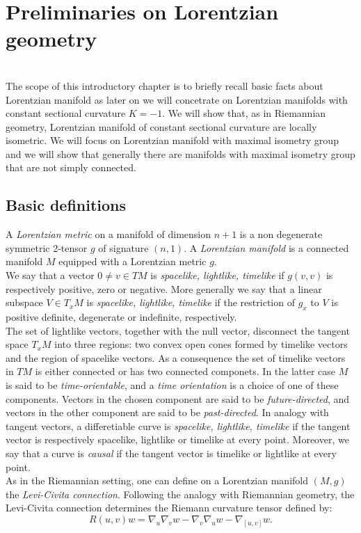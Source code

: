 \chapter{Preliminaries on Lorentzian geometry}

\\
The scope of this introductory chapter is to briefly recall basic facts about Lorentzian manifold as later on we will concetrate on Lorentzian manifolds with constant sectional curvature $K=-1$.
We will show that, as in Riemannian geometry, Lorentzian manifold of constant sectional curvature are locally isometric. We will focus on Lorentzian manifold with maximal isometry group and we will show that generally there are manifolds with maximal isometry group that are not simply connected.
\section{Basic definitions}
A \textit{Lorentzian metric} on a manifold of dimension $n+1$ is a non degenerate symmetric 2-tensor $g$ of signature $(n,1)$.
A \textit{Lorentzian manifold} is a connected manifold $M$ equipped with a Lorentzian metric $g$.\\
We say that a vector $0\neq v \in TM$ is \textit{spacelike, lightlike, timelike} if $g(v,v)$ is respectively positive, zero or negative.
More generally we say that a linear subspace $V \in T_x M$ is \textit{spacelike, lightlike, timelike} if the restriction of $g_x$ to $V$ is positive definite, degenerate or indefinite, respectively.\\
The set of lightlike vectors, together with the null vector, disconnect the tangent space $T_x M$ into three regions: two convex open cones formed by timelike vectors and the region of spacelike vectors.
As a consequence the set of timelike vectors in $TM$ is either connected or has two connected componets.
In the latter case $M$ is said to be \textit{time-orientable}, and a \textit{time orientation} is a choice of one of these components.
Vectors in the chosen component are said to be \textit{future-directed}, and vectors in the other component are said to be \textit{past-directed}.
In analogy with tangent vectors, a differetiable curve is \textit{spacelike, lightlike, timelike} if the tangent vector is respectively spacelike, lightlike or timelike at every point. Moreover, we say that a curve is \textit{causal} if the tangent vector is timelike or lightlike at every point.\\
As in the Riemannian setting, one can define on a Lorentzian manifold $(M,g)$ the \textit{Levi-Civita connection}. Following the analogy with Riemannian geometry, the Levi-Civita connection determines the Riemann curvature tensor defined by: 
\[
    R(u,v)w=\nabla_u\nabla_v w-\nabla_v\nabla_u w-\nabla_{[u,v]}w.
\]  

